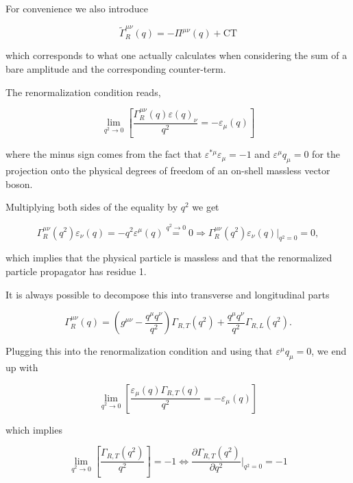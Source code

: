 \documentclass[../FeynCalcManual.tex]{subfiles}
\begin{document}
For convenience we also introduce

\begin{equation}
    \tilde{\Gamma}^{\mu \nu}_R(q) = - \Pi^{\mu \nu} (q) + \text{CT}
\end{equation}

which corresponds to what one actually calculates when considering the
sum of a bare amplitude and the corresponding counter-term.

The renormalization condition reads,

\begin{equation}
\lim_{q^2 \to 0} \left [ \frac{\Gamma_R^{\mu \nu} (q) \varepsilon(q)_\nu}{q^2}  = - \varepsilon_{\mu}(q) \right ]
\end{equation}

where the minus sign comes from the fact that
\(\varepsilon^{\ast \mu} \varepsilon_\mu = -1\) and
\(\varepsilon^\mu q_\mu =0\) for the projection onto the physical
degrees of freedom of an on-shell massless vector boson.

Multiplying both sides of the equality by \(q^2\) we get

\begin{equation}
\Gamma_R^{\mu \nu} (q^2)   \varepsilon_\nu (q) = - q^2 \varepsilon^{\mu}(q) \overset{q^2 \to 0}{=} 0 \Rightarrow \Gamma_R^{\mu \nu} (q^2) \varepsilon_\nu (q) \biggl|_{q^2=0}  = 0,
\end{equation}

which implies that the physical particle is massless and that the
renormalized particle propagator has residue 1.

It is always possible to decompose this into transverse and longitudinal
parts

\begin{equation}
\Gamma_R^{\mu \nu} (q) = \left ( g^{\mu \nu} - \frac{q^\mu q^\nu}{q^2} \right ) \Gamma_{R,T} (q^2) + \frac{q^\mu q^\nu}{q^2} \Gamma_{R,L} (q^2).
\end{equation}

Plugging this into the renormalization condition and using that
\(\varepsilon^\mu q_\mu = 0\), we end up with

\begin{equation}
        \lim_{q^2 \to 0} \left [ \frac{\varepsilon_{\mu}(q) \Gamma_{R,T} (q)}{q^2}  = - \varepsilon_{\mu}(q) \right ]
\end{equation}

which implies

\begin{equation}
        \lim_{q^2 \to 0} \left [ \frac{\Gamma_{R,T} (q^2)}{q^2}   \right ] = - 1 \Leftrightarrow \frac{\partial \Gamma_{R,T} (q^2) }{\partial q^2} \biggl |_{q^2=0} = - 1
\end{equation}
\end{document}
